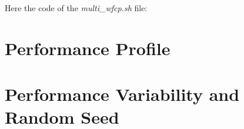 \begin{appendices}
Here the code of the \textit{multi\_wfcp.sh} file:
\newpage



\chapter{Performance Profile}

\chapter{Performance Variability and Random Seed}
















\end{appendices}



